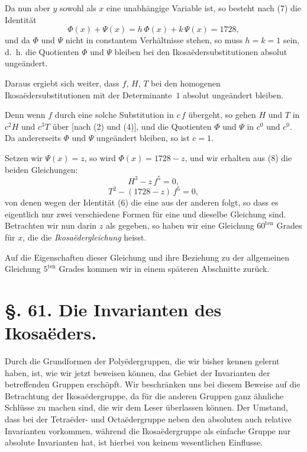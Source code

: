 \documentclass[12pt,a4paper]{article}
\theoremstyle{plain}
\theoremstyle{definition}
\theoremstyle{remark}
\begin{document}
Da nun aber $y$ sowohl als $x$ eine unabh\"angige Variable ist, so besteht nach (7) die Identit\"at
\[
\Phi(x) + \Psi(x) = h\,\Phi(x) + k\,\Psi(x) = 1728,
\]
und da $\Phi$ und $\Psi$ nicht in constantem Verh\"altnisse stehen, so muss $h = k = 1$ sein, d.~h. die Quotienten $\Phi$ und $\Psi$ bleiben bei den Ikosa\"edersubstitutionen absolut unge\"andert.

Daraus ergiebt sich weiter, dass $f$, $H$, $T$ bei den homogenen Ikosa\"edersubstitutionen mit der Determinante~$1$ absolut unge\"andert bleiben.

Denn wenn $f$ durch eine solche Substitution in $c\,f$ \"ubergeht, so gehen $H$ und $T$ in $c^{2}H$ und $c^{3}T$ \"uber [nach (2) und (4)], und die Quotienten $\Phi$ und $\Psi$ in $c^{0}$ und $c^{0}$. Da andererseits $\Phi$ und $\Psi$ unge\"andert bleiben, so ist $c = 1$.

Setzen wir $\Psi(x) = z$, so wird $\Phi(x) = 1728 - z$, und wir erhalten aus (8) die beiden Gleichungen:
\begin{equation}\tag{9}
H^{3} - z\,f^{5} = 0,
\end{equation}
\begin{equation}\tag{10}
T^{2} - (1728 - z)\,f^{5} = 0,
\end{equation}
von denen wegen der Identit\"at (6) die eine aus der anderen folgt, so dass es eigentlich nur zwei verschiedene Formen f\"ur eine und dieselbe Gleichung sind. Betrachten wir nun darin $z$ als gegeben, so haben wir eine Gleichung $60^{\text{ten}}$ Grades f\"ur $x$, die die \emph{Ikosa\"edergleichung} heisst.

Auf die Eigenschaften dieser Gleichung und ihre Beziehung zu der allgemeinen Gleichung $5^{\text{ten}}$ Grades kommen wir in einem sp\"ateren Abschnitte zur\"uck.


\section*{\S. 61. Die Invarianten des Ikosa\"eders.}

Durch die Grundformen der Poly\"edergruppen, die wir bisher kennen gelernt haben, ist, wie wir jetzt beweisen k\"onnen, das Gebiet der Invarianten der betreffenden Gruppen ersch\"opft. Wir beschr\"anken uns bei diesem Beweise auf die Betrachtung der Ikosa\"edergruppe, da f\"ur die anderen Gruppen ganz \"ahnliche Schl\"usse zu machen sind, die wir dem Leser \"uberlassen k\"onnen. Der Umstand, dass bei der Tetra\"eder- und Octa\"edergruppe neben den absoluten auch relative Invarianten vorkommen, w\"ahrend die Ikosa\"edergruppe als einfache Gruppe nur absolute Invarianten hat, ist hierbei von keinem wesentlichen Einflusse.
\end{document}
